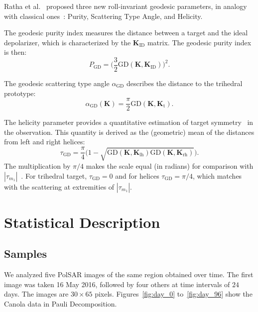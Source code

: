 \documentclass[journal]{IEEEtran}
\begin{document}
Ratha et al.~\cite{APolSARScatteringPowerFactorizationFrameworkandNovelRollInvariantParametersBasedUnsupervisedClassificationSchemeUsingaGeodesicDistanceinpress} proposed three new roll-invariant geodesic parameters, in analogy with classical ones~\cite{CloudePottier:97}: Purity, Scattering Type Angle, and Helicity.

The geodesic purity index measures the distance between a target and the ideal depolarizer, which is characterized by the $\bm{K}_{\text{ID}}$ matrix.
The geodesic purity index is then:
\begin{equation}
P_{\text{GD}} = \Big(\frac{3}{2}\text{GD}(\bm{K}, \bm{K}_{\text{ID}})\Big)^2.
\end{equation}

The geodesic scattering type angle $\alpha_{\text{GD}}$ describes 
the distance to the trihedral prototype:
\begin{equation}
\alpha_{\text{GD}}(\bm{K}) = \frac{\pi}{2}  \text{GD}(\bm{K},\bm{K}_{\text{t}}).
\end{equation}

The helicity parameter provides a quantitative estimation of target symmetry~\cite{Touzi:TGARS:2007} in the observation. 
This quantity is derived as the (geometric) mean of the distances from left and right helices:
\begin{equation}
\tau_{\text{GD}} = \frac\pi4 \big(1 - \sqrt{\text{GD}(\bm{K},\bm{K}_{\text{lh}})\text{GD}(\bm{K},\bm{K}_{\text{rh}})}\big).
\end{equation}
The multiplication by $\pi/4$ makes the scale equal (in radians) for comparison with $|\tau_{m_1}|$~\cite{Touzi:TGARS:2007}. 
For trihedral target, $\tau_{\text{GD}} = 0$ and for helices $\tau_{\text{GD}} = \pi/4$, which matches with the scattering at extremities of $|\tau_{m_1}|$. 

\section{Statistical Description}

\subsection{Samples}

We analyzed five PolSAR images of the same region obtained over time.
The first image was taken 16 May 2016, followed by four others at time intervals of $24$ days. The images are $30 \times 65$ pixels.
Figures~\ref{fig:day_0} to~\ref{fig:day_96} show the Canola data in Pauli Decomposition. 
\end{document}
